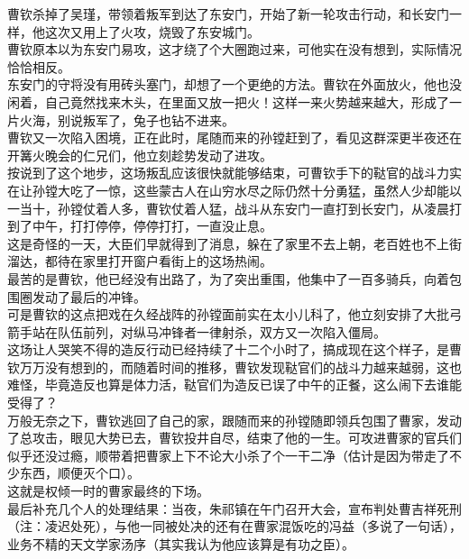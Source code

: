 \begin{multicols}{\theparacolNo}
曹钦杀掉了吴瑾，带领着叛军到达了东安门，开始了新一轮攻击行动，和长安门一样，他这次又用上了火攻，烧毁了东安城门。\\

曹钦原本以为东安门易攻，这才绕了个大圈跑过来，可他实在没有想到，实际情况恰恰相反。\\

东安门的守将没有用砖头塞门，却想了一个更绝的方法。曹钦在外面放火，他也没闲着，自己竟然找来木头，在里面又放一把火！这样一来火势越来越大，形成了一片火海，别说叛军了，兔子也钻不进来。\\

曹钦又一次陷入困境，正在此时，尾随而来的孙镗赶到了，看见这群深更半夜还在开篝火晚会的仁兄们，他立刻趁势发动了进攻。\\

按说到了这个地步，这场叛乱应该很快就能够结束，可曹钦手下的鞑官的战斗力实在让孙镗大吃了一惊，这些蒙古人在山穷水尽之际仍然十分勇猛，虽然人少却能以一当十，孙镗仗着人多，曹钦仗着人猛，战斗从东安门一直打到长安门，从凌晨打到了中午，打打停停，停停打打，一直没止息。\\

这是奇怪的一天，大臣们早就得到了消息，躲在了家里不去上朝，老百姓也不上街溜达，都待在家里打开窗户看街上的这场热闹。\\

最苦的是曹钦，他已经没有出路了，为了突出重围，他集中了一百多骑兵，向着包围圈发动了最后的冲锋。\\

可是曹钦的这点把戏在久经战阵的孙镗面前实在太小儿科了，他立刻安排了大批弓箭手站在队伍前列，对纵马冲锋者一律射杀，双方又一次陷入僵局。\\

这场让人哭笑不得的造反行动已经持续了十二个小时了，搞成现在这个样子，是曹钦万万没有想到的，而随着时间的推移，曹钦发现鞑官们的战斗力越来越弱，这也难怪，毕竟造反也算是体力活，鞑官们为造反已误了中午的正餐，这么闹下去谁能受得了？\\

万般无奈之下，曹钦逃回了自己的家，跟随而来的孙镗随即领兵包围了曹家，发动了总攻击，眼见大势已去，曹钦投井自尽，结束了他的一生。可攻进曹家的官兵们似乎还没过瘾，顺带着把曹家上下不论大小杀了个一干二净（估计是因为带走了不少东西，顺便灭个口）。\\

这就是权倾一时的曹家最终的下场。\\

最后补充几个人的处理结果：当夜，朱祁镇在午门召开大会，宣布判处曹吉祥死刑（注：凌迟处死），与他一同被处决的还有在曹家混饭吃的冯益（多说了一句话），业务不精的天文学家汤序（其实我认为他应该算是有功之臣）。\\


\end{multicols}
